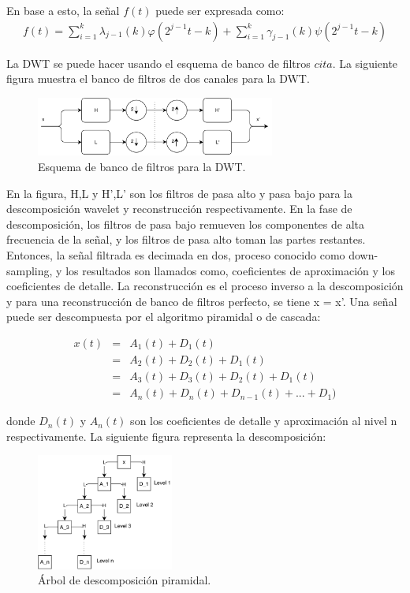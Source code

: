 En base a esto, la señal $f(t)$ puede ser expresada como:
\begin{eqnarray*}
	f(t) = \sum^{k}_{i=1}\lambda_{j-1}(k)\varphi(2^{j-1}t-k) + \sum^{k}_{i=1}\gamma_{j-1}(k)\psi(2^{j-1}t-k)
\end{eqnarray*}

La DWT se puede hacer usando el esquema de banco de filtros $cita$. La
siguiente figura muestra el banco de filtros de dos canales para la DWT.

\begin{figure}[h!t]
    \begin{center}
        \includegraphics[width=0.7\textwidth]{images/filter_bank}
        \caption{Esquema de banco de filtros para la DWT.}
    \end{center}
\end{figure}

En la figura, H,L y H',L' son los filtros de pasa alto y pasa bajo para la
descomposición wavelet y reconstrucción respectivamente. En la fase de
descomposición, los filtros de pasa bajo remueven los componentes de alta
frecuencia de la señal, y los filtros de pasa alto toman las partes restantes.
Entonces, la señal filtrada es decimada en dos, proceso conocido como
down-sampling, y los resultados son llamados como, coeficientes de aproximación
y los coeficientes de detalle. La reconstrucción es el proceso inverso a la
descomposición y para una reconstrucción de banco de filtros perfecto, se tiene
x = x'. Una señal puede ser descompuesta por el algoritmo piramidal o de cascada:

\begin{eqnarray*}
    x(t)	&=& A_1(t) + D_1(t)\\
			&=& A_2(t) + D_2(t) + D_1(t) \\
			&=& A_3(t) + D_3(t) + D_2(t) + D_1(t)\\
			&=& A_n(t) + D_n(t) + D_{n-1}(t) + ... + D_1)
\end{eqnarray*}

donde $D_n(t)$ y $A_n(t)$ son los coeficientes de detalle y aproximación al
nivel n respectivamente. La siguiente figura representa la descomposición:

\begin{figure}[h!t]
    \begin{center}
        \includegraphics[width=0.4\textwidth]{images/piramidal}
        \caption{Árbol de descomposición piramidal.}
    \end{center}
\end{figure}

